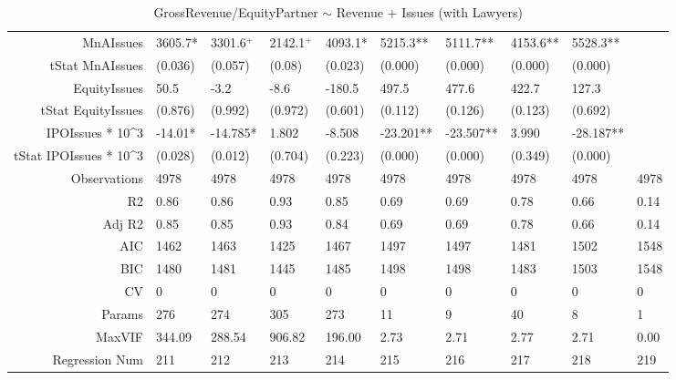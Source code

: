 \begin{table}[ht]
\begin{tabular}{rlllllllll}
  MnAIssues & 3605.7* & 3301.6$^{+}$ & 2142.1$^{+}$ & 4093.1* & 5215.3** & 5111.7** & 4153.6** & 5528.3** &  \\ 
  tStat MnAIssues & (0.036) & (0.057) & (0.08) & (0.023) & (0.000) & (0.000) & (0.000) & (0.000) &  \\ 
  EquityIssues & 50.5 & -3.2 & -8.6 & -180.5 & 497.5 & 477.6 & 422.7 & 127.3 &  \\ 
  tStat EquityIssues & (0.876) & (0.992) & (0.972) & (0.601) & (0.112) & (0.126) & (0.123) & (0.692) &  \\ 
  IPOIssues * 10^3 & -14.01* & -14.785* & 1.802 & -8.508 & -23.201** & -23.507** & 3.990 & -28.187** &  \\ 
  tStat IPOIssues * 10^3 & (0.028) & (0.012) & (0.704) & (0.223) & (0.000) & (0.000) & (0.349) & (0.000) &  \\ 
  Observations & 4978 & 4978 & 4978 & 4978 & 4978 & 4978 & 4978 & 4978 & 4978 \\ 
  R2 & 0.86 & 0.86 & 0.93 & 0.85 & 0.69 & 0.69 & 0.78 & 0.66 & 0.14 \\ 
  Adj R2 & 0.85 & 0.85 & 0.93 & 0.84 & 0.69 & 0.69 & 0.78 & 0.66 & 0.14 \\ 
  AIC & 1462 & 1463 & 1425 & 1467 & 1497 & 1497 & 1481 & 1502 & 1548 \\ 
  BIC & 1480 & 1481 & 1445 & 1485 & 1498 & 1498 & 1483 & 1503 & 1548 \\ 
  CV & 0 & 0 & 0 & 0 & 0 & 0 & 0 & 0 & 0 \\ 
  Params & 276 & 274 & 305 & 273 & 11 & 9 & 40 & 8 & 1 \\ 
  MaxVIF & 344.09 & 288.54 & 906.82 & 196.00 & 2.73 & 2.71 & 2.77 & 2.71 & 0.00 \\ 
  Regression Num & 211 & 212 & 213 & 214 & 215 & 216 & 217 & 218 & 219 \\ 
   \hline
\end{tabular}
\caption{GrossRevenue/EquityPartner $\sim$ Revenue + Issues (with Lawyers)} 
\end{table}

